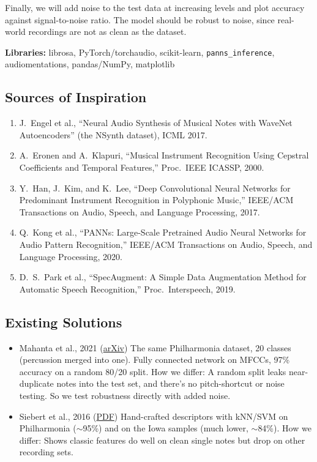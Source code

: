 \documentclass[12pt]{article}
\begin{document}
Finally, we will add noise to the test data at increasing levels and plot accuracy against signal-to-noise ratio. The model should be robust to noise, since real-world recordings are not as clean as the dataset.

{\raggedright\noindent\textbf{Libraries:} librosa, PyTorch/torchaudio, scikit-learn, \texttt{panns\_inference}, audiomentations, pandas/NumPy, matplotlib\par}

\subsection*{Sources of Inspiration}
\begin{enumerate}
    \item J.\ Engel et al., ``Neural Audio Synthesis of Musical Notes with WaveNet Autoencoders''
    (the NSynth dataset), ICML 2017.
    \item A.\ Eronen and A.\ Klapuri, ``Musical Instrument Recognition Using Cepstral Coefficients
    and Temporal Features,'' Proc.\ IEEE ICASSP, 2000.
    \item Y.\ Han, J.\ Kim, and K.\ Lee, ``Deep Convolutional Neural Networks for Predominant Instrument
    Recognition in Polyphonic Music,'' IEEE/ACM Transactions on Audio, Speech, and Language Processing, 2017.
    \item Q.\ Kong et al., ``PANNs: Large-Scale Pretrained Audio Neural Networks for Audio Pattern
    Recognition,'' IEEE/ACM Transactions on Audio, Speech, and Language Processing, 2020.
    \item D.\ S.\ Park et al., ``SpecAugment: A Simple Data Augmentation Method for Automatic Speech
    Recognition,'' Proc.\ Interspeech, 2019.
\end{enumerate}

\subsection*{Existing Solutions}
\begin{itemize}
    \item Mahanta et al., 2021 (\href{https://arxiv.org/pdf/2105.00933}{arXiv}) The same Philharmonia dataset, 20 classes (percussion merged into one). Fully connected network on MFCCs, 97\% accuracy on a random 80/20 split. How we differ: A random split leaks near-duplicate notes into the test set, and there’s no pitch-shortcut or noise testing. So we test robustness directly with added noise.
    \item Siebert et al., 2016 (\href{https://orbi.umons.ac.be/bitstream/20.500.12907/41932/1/Benelearn_2016_paper_40.pdf}{PDF}) Hand-crafted descriptors with kNN/SVM on Philharmonia ($\sim$95\%) and on the Iowa samples (much lower, $\sim$84\%). How we differ: Shows classic features do well on clean single notes but drop on other recording sets.
\end{itemize}
\end{document}
